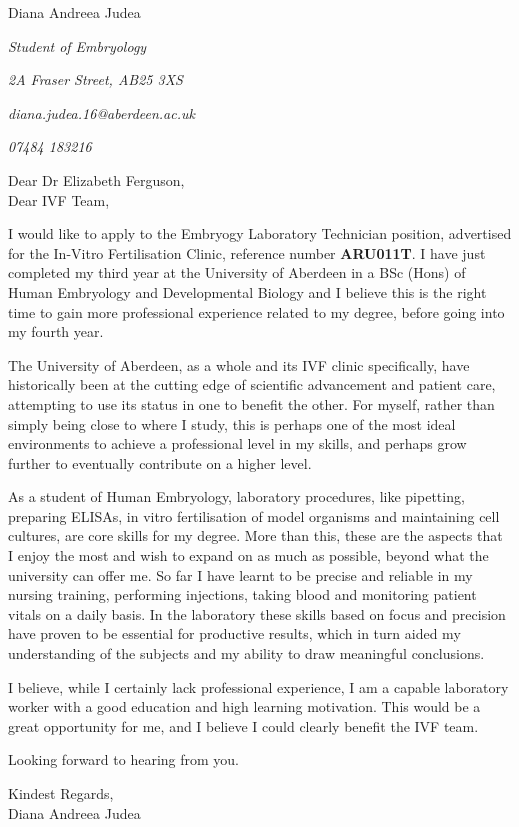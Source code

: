 \documentclass[paper=a4,fontsize=11pt]{scrartcl} %
\newcommand{\sepspace}{\vspace*{1em}}		%
\newcommand{\MyName}[1]{ %
  \Huge \usefont{OT1}{phv}{b}{n} \hfill #1
  \par \normalsize \normalfont}
\newcommand{\MySlogan}[4]{ %
  \large \usefont{OT1}{phv}{m}{n}\hfill \textit{#1} 
  \sepspace
  \par \normalsize \usefont{OT1}{phv}{m}{n}\hfill \textit{#2}
  \par \normalsize \usefont{OT1}{phv}{m}{n}\hfill \textit{#3}
  \par \normalsize \usefont{OT1}{phv}{m}{n}\hfill \textit{#4}
  \par \normalsize \normalfont}
\begin{document}
  
  \MyName{Diana Andreea Judea}
  \MySlogan{Student of Embryology}{2A Fraser Street, AB25 3XS}{diana.judea.16@aberdeen.ac.uk}{07484 183216}
  \sepspace \sepspace
  
  \noindent
  Dear Dr Elizabeth Ferguson, \\
  Dear IVF Team,
  
  \sepspace
  
    \noindent
    I would like to apply to the Embryogy Laboratory Technician position, advertised for the In-Vitro Fertilisation Clinic, reference number \textbf{ARU011T}. I have just completed my third year at the University of Aberdeen in a BSc (Hons) of Human Embryology and Developmental Biology and I believe this is the right time to gain more professional experience related to my degree, before going into my fourth year.
    \sepspace
    
    
    \noindent
    The University of Aberdeen, as a whole and its IVF clinic specifically, have historically been at the cutting edge of scientific advancement and patient care, attempting to use its status in one to benefit the other. For myself, rather than simply being close to where I study, this is perhaps one of the most ideal environments to achieve a professional level in my skills, and perhaps grow further to eventually contribute on a higher level.
    \sepspace
    
    
    \noindent
    As a student of Human Embryology, laboratory procedures, like pipetting, preparing ELISAs, in vitro fertilisation of model organisms and maintaining cell cultures, are core skills for my degree. More than this, these are the aspects that I enjoy the most and wish to expand on as much as possible, beyond what the university can offer me. So far I have learnt to be precise and reliable in my nursing training, performing injections, taking blood and monitoring patient vitals on a daily basis. In the laboratory these skills based on focus and precision have proven to be essential for productive results, which in turn aided my understanding of the subjects and my ability to draw meaningful conclusions.
    \sepspace
    
    
    \noindent
    I believe, while I certainly lack professional experience, I am a capable laboratory worker with a good education and high learning motivation. This would be a great opportunity for me, and I believe I could clearly benefit the IVF team.


  \sepspace
  
  \noindent
  Looking forward to hearing from you.
  \sepspace
  
  \noindent
  Kindest Regards, \\
  Diana Andreea Judea
  
  
  
\end{document}

